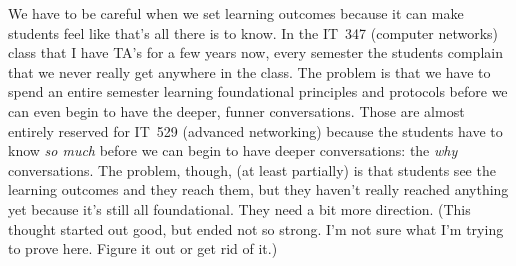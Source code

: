 \documentclass[man,natbib]{apa6}
\begin{document}
We have to be careful when we set learning outcomes because it can make students feel like that's all there is to know. In the IT~347 (computer networks) class that I have TA's for a few years now, every semester the students complain that we never really get anywhere in the class. The problem is that we have to spend an entire semester learning foundational principles and protocols before we can even begin to have the deeper, funner conversations. Those are almost entirely reserved for IT~529 (advanced networking) because the students have to know \emph{so much} before we can begin to have deeper conversations: the \emph{why} conversations. The problem, though, (at least partially) is that students see the learning outcomes and they reach them, but they haven't really reached anything yet because it's still all foundational. They need a bit more direction. (This thought started out good, but ended not so strong. I'm not sure what I'm trying to prove here. Figure it out or get rid of it.)


\end{document}
